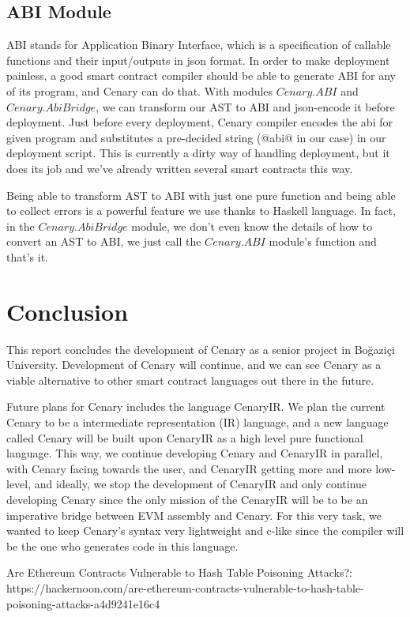 \documentclass{article}
\begin{document}
\subsection{ABI Module}
\label{abi-module}
ABI stands for Application Binary Interface, which is a specification of callable functions and their input/outputs in json format. In order to make deployment painless, a good smart contract compiler should be able to generate ABI for any of its program, and Cenary can do that. With modules $Cenary.ABI$ and $Cenary.AbiBridge$, we can transform our AST to ABI and json-encode it before deployment. Just before every deployment, Cenary compiler encodes the abi for given program and substitutes a pre-decided string (@abi@ in our case) in our deployment script. This is currently a dirty way of handling deployment, but it does its job and we've already written several smart contracts this way.
\par Being able to transform AST to ABI with just one pure function and being able to collect errors is a powerful feature we use thanks to Haskell language. In fact, in the $Cenary.AbiBridge$ module, we don't even know the details of how to convert an AST to ABI, we just call the $Cenary.ABI$ module's function and that's it.

\newpage

\section{Conclusion}
This report concludes the development of Cenary as a senior project in Boğaziçi University. Development of Cenary will continue, and we can see Cenary as a viable alternative to other smart contract languages out there in the future.
\par Future plans for Cenary includes the language CenaryIR. We plan the current Cenary to be a intermediate representation (IR) language, and a new language called Cenary will be built upon CenaryIR as a high level pure functional language. This way, we continue developing Cenary and CenaryIR in parallel, with Cenary facing towards the user, and CenaryIR getting more and more low-level, and ideally, we stop the development of CenaryIR and only continue developing Cenary since the only mission of the CenaryIR will be to be an imperative bridge between EVM assembly and Cenary. For this very task, we wanted to keep Cenary's syntax very lightweight and c-like since the compiler will be the one who generates code in this language.
\newpage
\begin{thebibliography}{2}
  Are Ethereum Contracts Vulnerable to Hash Table Poisoning Attacks?: https://hackernoon.com/are-ethereum-contracts-vulnerable-to-hash-table-poisoning-attacks-a4d9241e16c4
\end{thebibliography}
\end{document}

